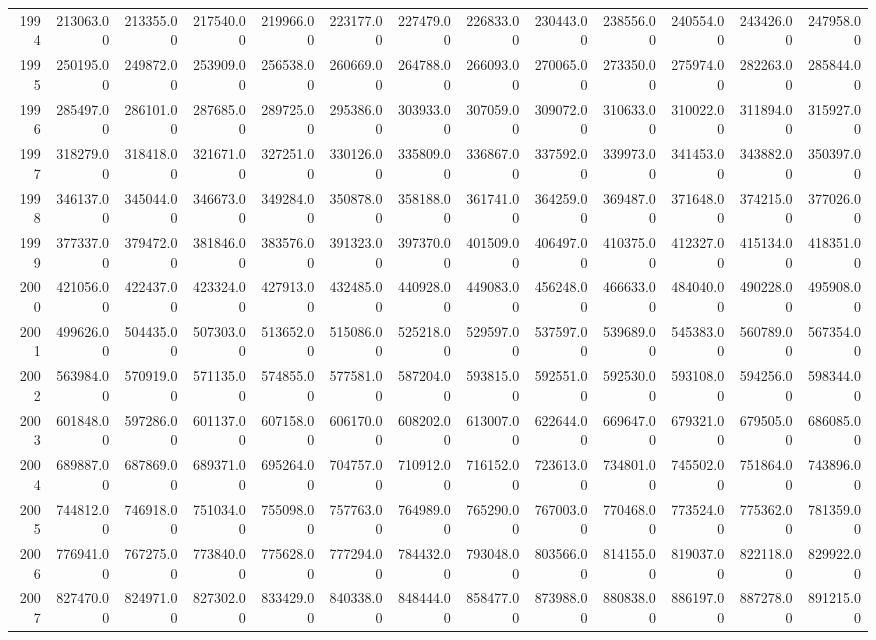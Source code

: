 \begin{longtable}{rrrrrrrrrrrrr}
  1994 & 213063.00 & 213355.00 & 217540.00 & 219966.00 & 223177.00 & 227479.00 & 226833.00 & 230443.00 & 238556.00 & 240554.00 & 243426.00 & 247958.00 \\ 
  1995 & 250195.00 & 249872.00 & 253909.00 & 256538.00 & 260669.00 & 264788.00 & 266093.00 & 270065.00 & 273350.00 & 275974.00 & 282263.00 & 285844.00 \\ 
  1996 & 285497.00 & 286101.00 & 287685.00 & 289725.00 & 295386.00 & 303933.00 & 307059.00 & 309072.00 & 310633.00 & 310022.00 & 311894.00 & 315927.00 \\ 
  1997 & 318279.00 & 318418.00 & 321671.00 & 327251.00 & 330126.00 & 335809.00 & 336867.00 & 337592.00 & 339973.00 & 341453.00 & 343882.00 & 350397.00 \\ 
  1998 & 346137.00 & 345044.00 & 346673.00 & 349284.00 & 350878.00 & 358188.00 & 361741.00 & 364259.00 & 369487.00 & 371648.00 & 374215.00 & 377026.00 \\ 
  1999 & 377337.00 & 379472.00 & 381846.00 & 383576.00 & 391323.00 & 397370.00 & 401509.00 & 406497.00 & 410375.00 & 412327.00 & 415134.00 & 418351.00 \\ 
  2000 & 421056.00 & 422437.00 & 423324.00 & 427913.00 & 432485.00 & 440928.00 & 449083.00 & 456248.00 & 466633.00 & 484040.00 & 490228.00 & 495908.00 \\ 
  2001 & 499626.00 & 504435.00 & 507303.00 & 513652.00 & 515086.00 & 525218.00 & 529597.00 & 537597.00 & 539689.00 & 545383.00 & 560789.00 & 567354.00 \\ 
  2002 & 563984.00 & 570919.00 & 571135.00 & 574855.00 & 577581.00 & 587204.00 & 593815.00 & 592551.00 & 592530.00 & 593108.00 & 594256.00 & 598344.00 \\ 
  2003 & 601848.00 & 597286.00 & 601137.00 & 607158.00 & 606170.00 & 608202.00 & 613007.00 & 622644.00 & 669647.00 & 679321.00 & 679505.00 & 686085.00 \\ 
  2004 & 689887.00 & 687869.00 & 689371.00 & 695264.00 & 704757.00 & 710912.00 & 716152.00 & 723613.00 & 734801.00 & 745502.00 & 751864.00 & 743896.00 \\ 
  2005 & 744812.00 & 746918.00 & 751034.00 & 755098.00 & 757763.00 & 764989.00 & 765290.00 & 767003.00 & 770468.00 & 773524.00 & 775362.00 & 781359.00 \\ 
  2006 & 776941.00 & 767275.00 & 773840.00 & 775628.00 & 777294.00 & 784432.00 & 793048.00 & 803566.00 & 814155.00 & 819037.00 & 822118.00 & 829922.00 \\ 
  2007 & 827470.00 & 824971.00 & 827302.00 & 833429.00 & 840338.00 & 848444.00 & 858477.00 & 873988.00 & 880838.00 & 886197.00 & 887278.00 & 891215.00 \\ 

\end{longtable}

